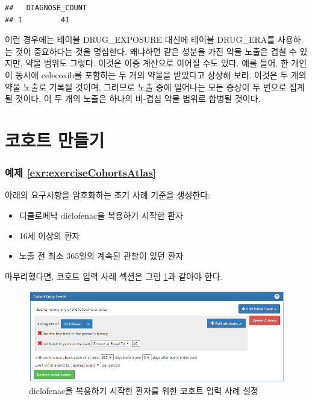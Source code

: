 \documentclass[10.5pt]{book}
\providecommand{\tightlist}{%
  \setlength{\itemsep}{0pt}\setlength{\parskip}{0pt}}
\theoremstyle{definition}
\theoremstyle{definition}
\theoremstyle{definition}
\theoremstyle{remark}
\begin{document}
\begin{verbatim}
##   DIAGNOSE_COUNT
## 1         41
\end{verbatim}

이런 경우에는 테이블 DRUG\_EXPOSURE 대신에 테이블 DRUG\_ERA를 사용하는
것이 중요하다는 것을 명심한다. 왜냐하면 같은 성분을 가진 약물 노출은
겹칠 수 있지만, 약물 범위도 그렇다. 이것은 이중 계산으로 이어질 수도
있다. 예를 들어, 한 개인이 동시에 celecoxib를 포함하는 두 개의 약물을
받았다고 상상해 보라. 이것은 두 개의 약물 노출로 기록될 것이며, 그러므로
노출 중에 일어나는 모든 증상이 두 번으로 집계될 것이다. 이 두 개의
노출은 하나의 비-겹침 약물 범위로 합병될 것이다.

\section{코호트 만들기}\label{Cohortsanswers}

\subsubsection*{예제
\ref{exr:exerciseCohortsAtlas}}\label{-refexrexercisecohortsatlas}

아래의 요구사항을 암호화하는 초기 사례 기준을 생성한다:

\begin{itemize}
\tightlist
\item
  디클로페낙 diclofenac을 복용하기 시작한 환자
\item
  16세 이상의 환자
\item
  노출 전 최소 365일의 계속된 관찰이 있던 환자
\end{itemize}

마무리했다면, 코호트 입력 사례 섹션은 그림
\ref{fig:cohortsAtlasInitialEvents}과 같아야 한다.

\begin{figure}

{\centering \includegraphics[width=1\linewidth]{images/SuggestedAnswers/cohortsAtlasInitialEvents} 

}

\caption{diclofenac을 복용하기 시작한 환자를 위한 코호트 입력 사례 설정}\label{fig:cohortsAtlasInitialEvents}
\end{figure}
\end{document}
